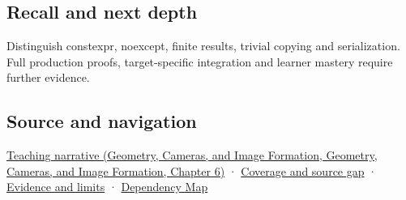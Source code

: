\subsection{Recall and next depth}\label{appendix-37a39984ba66-recall-and-next-depth}

Distinguish constexpr, noexcept, finite results, trivial copying and serialization. Full production proofs, target-specific integration and learner mastery require further evidence.

\subsection{Source and navigation}\label{appendix-37a39984ba66-source-and-navigation}

\href{../03-Geometry-Cameras-and-Image-Formation/main.pdf\#nameddest=02-foundations-ii-ch037-three-stored-numbers-are-not-the-complete-contract}{Teaching narrative (Geometry, Cameras, and Image Formation, Geometry, Cameras, and Image Formation, Chapter 6)} · \hyperref[appendix-fd090d982a15-phase-6---parts-501-600]{Coverage and source gap} · \hyperref[appendix-a103e7846d21-phase-6---source-analysis-and-verification]{Evidence and limits} · \hyperref[appendix-4ad47bdd269a]{Dependency Map}
